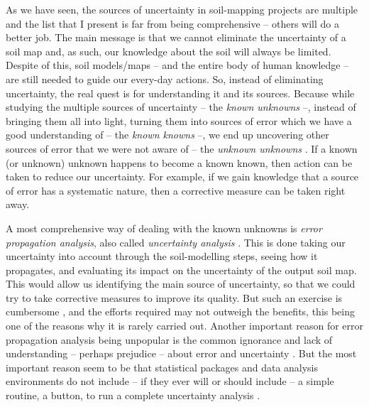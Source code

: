As we have seen, the sources of uncertainty in soil-mapping projects are multiple and the list that I
present is far from being comprehensive -- others will do a better job. The main message is that we
cannot eliminate the uncertainty of a soil map and, as such, our knowledge about the soil will always
be limited. Despite of this, soil models/maps -- and the entire body of human knowledge -- are still
needed to guide our every-day actions. So, instead of eliminating uncertainty, the real quest is for
understanding it and its sources. Because while studying the multiple sources of uncertainty -- the
\emph{known unknowns} --, instead of bringing them all into light, turning them into sources of error
which we have a good understanding of -- the \emph{known knowns} --, we end up uncovering other sources
of error that we were not aware of -- the \emph{unknown unknowns} \cite{Wikipedia2015}. If a known
(or unknown) unknown happens to become a known known, then action can be taken to reduce our
uncertainty. For example, if we gain knowledge that a source of error has a systematic nature, then a
corrective measure can be taken right away.

A most comprehensive way of dealing with the known unknowns is \emph{error propagation analysis},
also called \emph{uncertainty analysis} \cite{HeuvelinkEtAl1989,Taylor1997}. This is done taking
our uncertainty into account through the soil-modelling steps, seeing how it propagates, and
evaluating its impact on the uncertainty of the output soil map. This would allow us identifying the
main source of uncertainty, so that we could try to take corrective measures to improve its quality.
But such an exercise is cumbersome \cite{NelsonEtAl2011}, and the efforts required may not
outweigh the benefits, this being one of the reasons why it is rarely carried out. Another important
reason for error propagation analysis being unpopular is the common ignorance and lack of
understanding -- perhaps prejudice -- about error and uncertainty \cite{Wechsler2003,Heuvelink2005}.
But the most important reason seem to be that statistical packages and data analysis environments do
not include -- if they ever will or should include -- a simple routine, a button, to run a complete
uncertainty analysis \cite{HeuvelinkEtAl2006b}.

